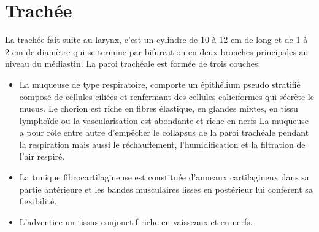 
\chapter{Trachée} %


\label{ch:01-01} %



La trachée fait suite au larynx, c’est un cylindre de 10 à 12 cm de long et de 1 à 2 cm de diamètre qui se termine par bifurcation en deux bronches principales au niveau du médiastin. La paroi trachéale est formée de trois couches: 

\begin{itemize}
\item La muqueuse de type respiratoire, comporte un épithélium pseudo stratifié composé de cellules ciliées et renfermant des cellules caliciformes qui sécrète le mucus. Le chorion est riche en fibres élastique, en glandes mixtes, en tissu lymphoïde ou la vascularisation est abondante et riche en nerfs La muqueuse a pour rôle entre autre d’empêcher le collapsus de la paroi trachéale pendant la respiration mais aussi le réchauffement, l’humidification et la filtration de l’air respiré.
\item La tunique fibrocartilagineuse est constituée d’anneaux cartilagineux dans sa partie antérieure et les bandes musculaires lisses en postérieur lui confèrent sa flexibilité.
\item L’adventice un tissus conjonctif riche en vaisseaux et en nerfs.
\end{itemize}

